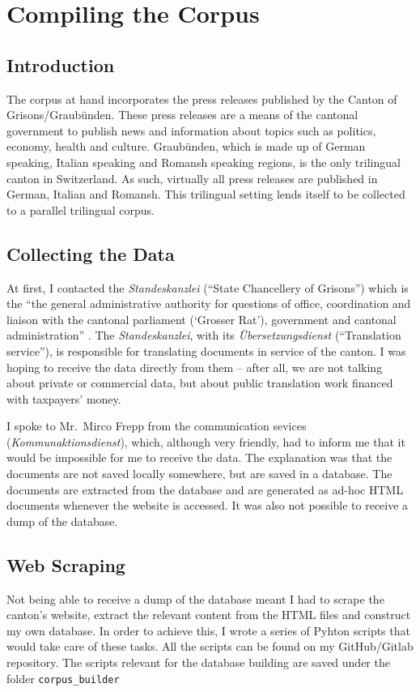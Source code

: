 \chapter{Compiling the Corpus}
\section{Introduction}

The corpus at hand incorporates the press releases published by the Canton of Grisons/Graubünden. 
These press releases are a means of the cantonal government to publish news and information about topics such as politics, economy, health and culture. 
Graubünden, which is made up of German speaking, Italian speaking and Romansh speaking regions, is the only trilingual canton in Switzerland. 
As such, virtually all press releases are published in German, Italian and Romansh. 
This trilingual setting lends itself to be collected to a parallel trilingual corpus.

\section{Collecting the Data}
At first, I contacted the \emph{Standeskanzlei} (\enquote{State Chancellery of Grisons}) which is the \enquote{the general administrative authority for questions of office, coordination and liaison with the cantonal parliament (\enquote{Grosser Rat}), government and cantonal administration} \autocite{staka}. 
The \emph{Standeskanzlei}, with its \emph{Übersetzungsdienst} (\enquote{Translation service}), is responsible for translating documents in service of the canton.
I was hoping to receive the data directly from them -- after all, we are not talking about private or commercial data, but about public translation work financed with taxpayers' money.

I spoke to Mr.~Mirco Frepp from the communication sevices (\emph{Kommunaktionsdienst}), which, although very friendly, had to inform me that it would be impossible for me to receive the data. 
The explanation was that the documents are not saved locally somewhere, but are saved in a database. 
The documents are extracted from the database and are generated as ad-hoc HTML documents whenever the website is accessed. 
It was also not possible to receive a dump of the database.

\section{Web Scraping}
Not being able to receive a dump of the database meant I had to scrape the canton's website, extract the relevant content from the HTML files and construct my own database. In order to achieve this, I wrote a series of Pyhton scripts that would take care of these tasks. 
All the scripts can be found on my GitHub/Gitlab repository. 
The scripts relevant for the database building are saved under the folder \texttt{corpus\_builder}

